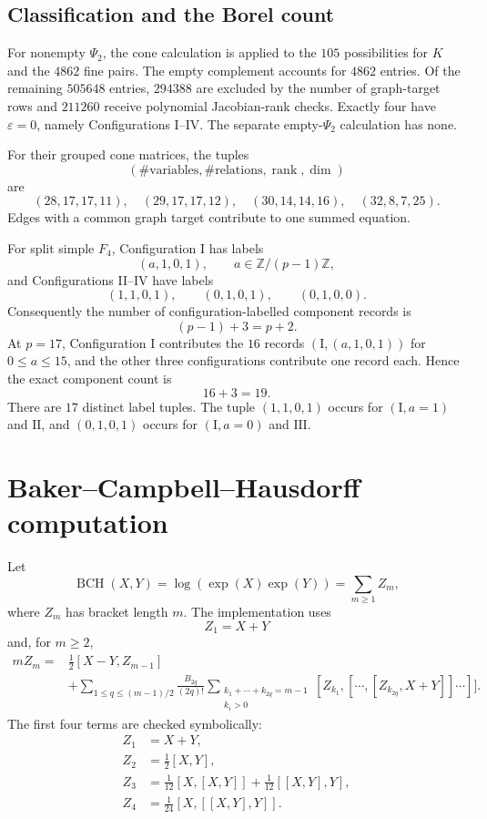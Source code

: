 \documentclass[11pt]{amsart}
\newcommand{\Z}{\mathbb Z}
\begin{document}
\subsection{Classification and the Borel count}

For nonempty $\Psi_2$, the cone calculation is applied to the $105$
possibilities for $K$ and the $4862$ fine pairs.  The empty complement accounts
for $4862$ entries.  Of the remaining $505648$ entries, $294388$ are excluded by
the number of graph-target rows and $211260$ receive polynomial Jacobian-rank
checks.  Exactly four have $\varepsilon=0$, namely Configurations I--IV.  The
separate empty-$\Psi_2$ calculation has none.

For their grouped cone matrices, the tuples
\[
(\#\text{variables},\#\text{relations},\operatorname{rank},\dim)
\]
are
\[
(28,17,17,11),\quad(29,17,17,12),\quad
(30,14,14,16),\quad(32,8,7,25).
\]
Edges with a common graph target contribute to one summed equation.

For split simple $F_4$, Configuration I has labels
\[
(a,1,0,1),\qquad a\in\Z/(p-1)\Z,
\]
and Configurations II--IV have labels
\[
(1,1,0,1),\qquad(0,1,0,1),\qquad(0,1,0,0).
\]
Consequently the number of configuration-labelled component records is
\[
(p-1)+3=p+2.
\]
At $p=17$, Configuration I contributes the $16$ records
$(\mathrm I,(a,1,0,1))$ for $0\le a\le15$, and the other three configurations
contribute one record each.  Hence the exact component count is
\[
16+3=19.
\]
There are $17$ distinct label tuples.  The tuple $(1,1,0,1)$ occurs for
$(\mathrm I,a=1)$ and $\mathrm{II}$, and $(0,1,0,1)$ occurs for
$(\mathrm I,a=0)$ and $\mathrm{III}$.

\section{Baker--Campbell--Hausdorff computation}
\label{sec:bch}

Let
\[
\operatorname{BCH}(X,Y)=\log(\exp(X)\exp(Y))=\sum_{m\ge1}Z_m,
\]
where $Z_m$ has bracket length $m$.  The implementation uses
\[
Z_1=X+Y
\]
and, for $m\ge2$,
\[
\begin{aligned}
mZ_m={}&\frac12[X-Y,Z_{m-1}]\\
&+\sum_{1\le q\le(m-1)/2}\frac{B_{2q}}{(2q)!}
\sum_{\substack{k_1+\cdots+k_{2q}=m-1\\k_i>0}}
[Z_{k_1},[\cdots,[Z_{k_{2q}},X+Y]]\cdots]].
\end{aligned}
\]
The first four terms are checked symbolically:
\[
\begin{aligned}
Z_1&=X+Y,\\
Z_2&=\tfrac12[X,Y],\\
Z_3&=\tfrac1{12}[X,[X,Y]]+\tfrac1{12}[[X,Y],Y],\\
Z_4&=\tfrac1{24}[X,[[X,Y],Y]].
\end{aligned}
\]
\end{document}
